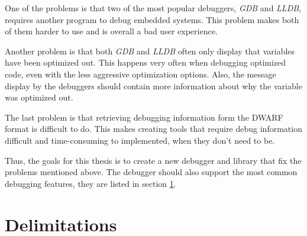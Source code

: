 One of the problems is that two of the most popular debuggers, \emph{GDB} and \emph{LLDB}, requires another program to debug embedded systems.
This problem makes both of them harder to use and is overall a bad user experience.


Another problem is that both \emph{GDB} and \emph{LLDB} often only display that variables have been optimized out.
This happens very often when debugging optimized code, even with the less aggressive optimization options.
Also, the message display by the debuggers should contain more information about why the variable was optimized out.


The last problem is that retrieving debugging information form the \gls{DWARF} format is difficult to do. 
This makes creating tools that require debug information difficult and time-consuming to implemented, when they don't need to be.


Thus, the goals for this thesis is to create a new debugger and library that fix the problems mentioned above.
The debugger should also support the most common debugging features, they are listed in section \ref{sec:delimitations}.









\section{Delimitations}
\label{sec:delimitations}


